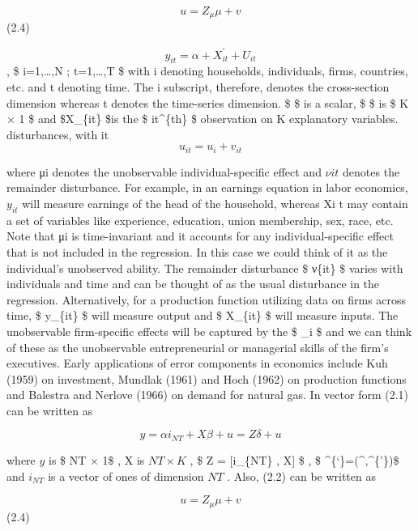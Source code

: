 \documentclass[
]{book}
\begin{document}
\begin{equation} u=Z_\mu \mu +v  \end{equation} (2.4)

\[  y_{it} = \alpha + X_{it}^{'} + U_{it}   \] , \$ i=1,\ldots,N ; t=1,\ldots,T \$ with i denoting households, individuals, firms, countries, etc. and t denoting time. The i subscript, therefore, denotes the cross-section dimension whereas t denotes the time-series dimension. \$ \alpha \$ is a scalar, \$ \beta \$ is \$ K × 1 \$ and \$X\_\{it\} \$is the \$ it\^{}\{th\} \$ observation on K explanatory variables. disturbances, with it \[ u_{it}=u_i  + v_{it}     \]

where μi denotes the unobservable individual-specific effect and \(ν{it}\) denotes the remainder disturbance. For example, in an earnings equation in labor economics, \(y_{it}\) will measure earnings of the head of the household, whereas Xi t may contain a set of variables like experience, education, union membership, sex, race, etc. Note that μi is time-invariant and it accounts for any individual-specific effect that is not included in the regression. In this case we could think of it as the individual's unobserved ability. The remainder disturbance \$ ν\{it\} \$ varies with individuals and time and can be thought of as the usual disturbance in the regression. Alternatively, for a production function utilizing data on firms across time, \$ y\_\{it\} \$ will measure output and \$ X\_\{it\} \$ will measure inputs. The unobservable firm-specific effects will be captured by the \$ \mu\_i \$ and we can think of these as the unobservable entrepreneurial or managerial skills of the firm's executives. Early applications of error components in economics include Kuh (1959) on investment, Mundlak (1961) and Hoch (1962) on production functions and Balestra and Nerlove (1966) on demand for natural gas. In vector form (2.1) can be written as

\[ y= \alpha i_{NT}  + X\beta +u = Z\delta + u \]

where \(y\) is \$ NT × 1\$ , X is \(NT × K\) , \$ Z = {[}i\_\{NT\} , X{]} \$ , \$ \delta\^{}\{`\}=(\^{},\beta\^{}\{'\})\$ and \(i_{NT}\) is a vector of ones of dimension \(NT\) . Also, (2.2) can be written as

\begin{equation} u=Z_\mu \mu  + v\end{equation} (2.4)
\end{document}
